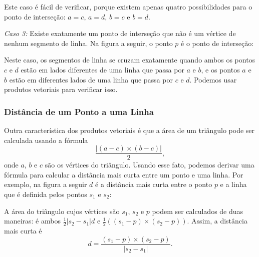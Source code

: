 Este caso é fácil de verificar, porque
existem apenas quatro possibilidades
para o ponto de interseção:
$a=c$, $a=d$, $b=c$ e $b=d$.

\textit{Caso 3:}
Existe exatamente um ponto de interseção
que não é um vértice de nenhum segmento de linha.
Na figura a seguir, o ponto $p$
é o ponto de interseção:
\begin{center}
\end{center}

Neste caso, os segmentos de linha se cruzam
exatamente quando ambos os pontos $c$ e $d$ estão
em lados diferentes de uma linha que passa por $a$ e $b$,
e os pontos $a$ e $b$ estão em diferentes
lados de uma linha que passa por $c$ e $d$.
Podemos usar produtos vetoriais para verificar isso.

\subsubsection{Distância de um Ponto a uma Linha}

Outra característica dos produtos vetoriais é que
a área de um triângulo pode ser calculada
usando a fórmula
\[\frac{| (a-c) \times (b-c) |}{2},\]
onde $a$, $b$ e $c$ são os vértices do triângulo.
Usando esse fato, podemos derivar uma fórmula
para calcular a distância mais curta entre um ponto e uma linha.
Por exemplo, na figura a seguir $d$ é a
distância mais curta entre o ponto $p$ e a linha
que é definida pelos pontos $s_1$ e $s_2$:
\begin{center}
\end{center}

A área do triângulo cujos vértices são
$s_1$, $s_2$ e $p$ podem ser calculados de duas maneiras:
é ambos
$\frac{1}{2} |s_2-s_1| d$ e
$\frac{1}{2} ((s_1-p) \times (s_2-p))$.
Assim, a distância mais curta é
\[ d = \frac{(s_1-p) \times (s_2-p)}{|s_2-s_1|} .\]


